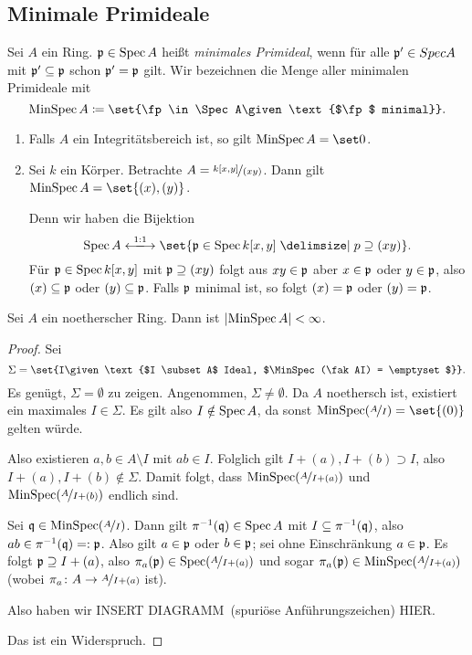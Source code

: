 \documentclass[12pt,a4paper]{scrartcl}
\theoremstyle{cplain}
\theoremstyle{cdef}
\begin{document}
\subsection{Minimale Primideale}
\begin{defi} Sei $A$ ein Ring. $\mathfrak{p}\in \operatorname{Spec} A$ heißt \emph{minimales Primideal}, wenn für alle $\mathfrak{p}'\in Spec A$ mit $\mathfrak{p}'\subseteq \mathfrak{p}$ schon $\mathfrak{p}' = \mathfrak{p}$ gilt. Wir bezeichnen die Menge aller minimalen Primideale mit \[\MinSpec A \coloneqq \set{\fp\in\Spec A\given \text{$\fp$ minimal}}.\]
\end{defi}
\begin{bsp}
	\leavevmode
	\begin{enumerate}
		\item Falls $A$ ein Integritätsbereich ist, so gilt $ \MinSpec A = \set 0$.
		\item Sei $k$ ein Körper. Betrachte $A = \nicefrac{k[x,y]}{(xy)}$. Dann gilt $\MinSpec A = \set{(x), (y)}$.
		
		Denn wir haben die Bijektion \[\Spec A \xlongleftrightarrow{1:1}\set {\fp\in\Spec k[x,y]\given p\supseteq (xy)}.\]
		Für $\mathfrak{p}\in \operatorname{Spec} k[x,y]$ mit $\mathfrak{p}\supseteq (xy)$ folgt aus  $xy\in \mathfrak{p}$ aber $ x\in \mathfrak{p}$ oder $y \in\mathfrak{p}$, also $(x)\subseteq \mathfrak{p}$ oder $(y)\subseteq \mathfrak{p}$. Falls $\mathfrak{p}$ minimal ist, so folgt $(x) = \mathfrak{p}$ oder $(y) = \mathfrak{p}$.
	\end{enumerate}
\end{bsp}
\begin{satz}
	Sei $A$ ein noetherscher Ring. Dann ist $\lvert\operatorname{MinSpec} A\rvert<\infty$.
\end{satz}
\begin{proof}
	Sei \[\Sigma = \set{I\given \text{$I \subset A$ Ideal, $\MinSpec(\fak AI) = \emptyset$}}.\] Es genügt, $\Sigma = \emptyset$ zu zeigen. Angenommen, $\Sigma \neq \emptyset$. Da $A$ noethersch ist, existiert ein maximales $I\in \Sigma$. Es gilt also $I\notin \operatorname{Spec} A$, da sonst $\MinSpec(\fak{A}I) = \set {(0)}$ gelten würde. 
	
	Also existieren $a,b\in A\setminus I$ mit $ab\in I$. Folglich gilt $I+(a), I+(b)\supset I$, also $I+(a), I+(b)\notin \Sigma$. Damit folgt, dass $\operatorname{MinSpec}(\nicefrac{A}{I+(a)})$ und $ \operatorname{MinSpec}(\nicefrac{A}{I+(b)})$ endlich sind.
	
	Sei $\mathfrak{q}\in\operatorname{MinSpec}(\nicefrac{A}{I})$. Dann gilt $\pi^{-1}(\mathfrak{q})\in \operatorname{Spec} A$ mit $I\subseteq \pi^{-1}(\mathfrak{q})$, also $ab\in \pi^{-1}(\mathfrak{q}) =: \mathfrak{p}$. Also gilt $a\in \mathfrak{p}$ oder $b\in \mathfrak{p}$; sei ohne Einschränkung $a\in \mathfrak{p}$. Es folgt $\mathfrak{p}\supseteq I+(a)$, also $\pi_a(\mathfrak{p}) \in\operatorname{Spec}(\nicefrac{A}{I+(a)})$ und sogar $\pi_{a}(\mathfrak{p}) \in \operatorname{MinSpec}(\nicefrac{A}{I+(a)})$ (wobei $\pi_a\colon A\to \nicefrac{A}{I+(a)}$ ist).
	
	Also haben wir
	INSERT \glqq DIAGRAMM\grqq\ (spuriöse Anführungszeichen) HIER.
	
	Das ist ein Widerspruch.
\end{proof}
\end{document}
